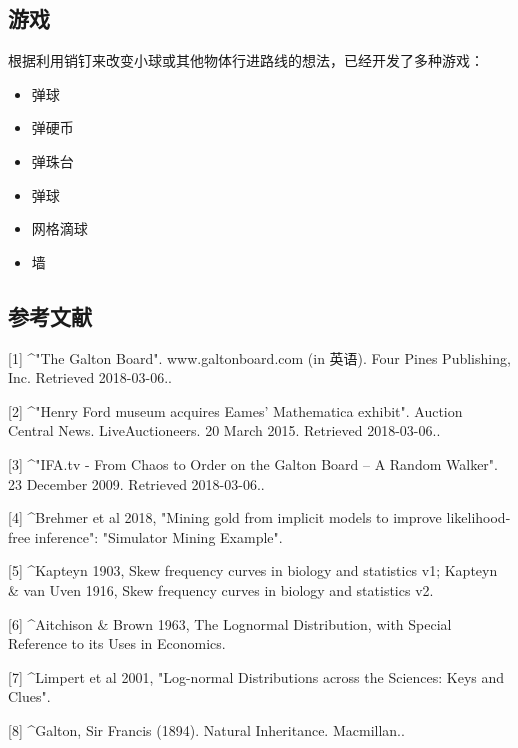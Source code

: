 \subsection{游戏}

根据利用销钉来改变小球或其他物体行进路线的想法，已经开发了多种游戏：

\begin{itemize}
\item 弹球
\item 弹硬币
\item 弹珠台
\item 弹球
\item 网格滴球
\item 墙
\end{itemize}

\subsection{参考文献}

[1]
^"The Galton Board". www.galtonboard.com (in 英语). Four Pines Publishing, Inc. Retrieved 2018-03-06..

[2]
^"Henry Ford museum acquires Eames' Mathematica exhibit". Auction Central News. LiveAuctioneers. 20 March 2015. Retrieved 2018-03-06..

[3]
^"IFA.tv - From Chaos to Order on the Galton Board -- A Random Walker". 23 December 2009. Retrieved 2018-03-06..

[4]
^Brehmer et al 2018, "Mining gold from implicit models to improve likelihood-free inference": "Simulator Mining Example".

[5]
^Kapteyn 1903, Skew frequency curves in biology and statistics v1; Kapteyn & van Uven 1916, Skew frequency curves in biology and statistics v2.

[6]
^Aitchison & Brown 1963, The Lognormal Distribution, with Special Reference to its Uses in Economics.

[7]
^Limpert et al 2001, "Log-normal Distributions across the Sciences: Keys and Clues".

[8]
^Galton, Sir Francis (1894). Natural Inheritance. Macmillan..